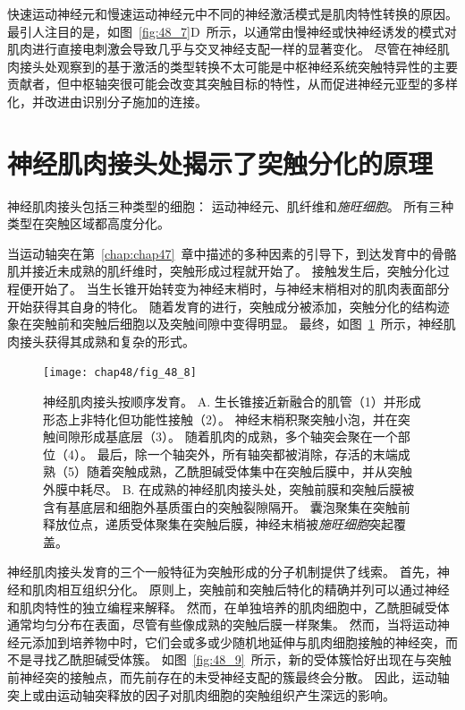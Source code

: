 快速运动神经元和慢速运动神经元中不同的神经激活模式是肌肉特性转换的原因。
最引人注目的是，如图~\ref{fig:48_7}D~所示，以通常由慢神经或快神经诱发的模式对肌肉进行直接电刺激会导致几乎与交叉神经支配一样的显著变化。
尽管在神经肌肉接头处观察到的基于激活的类型转换不太可能是中枢神经系统突触特异性的主要贡献者，但中枢轴突很可能会改变其突触目标的特性，从而促进神经元亚型的多样化，并改进由识别分子施加的连接。



\section{神经肌肉接头处揭示了突触分化的原理}

神经肌肉接头包括三种类型的细胞：
运动神经元、肌纤维和\textit{施旺细胞}。
所有三种类型在突触区域都高度分化。


当运动轴突在第~\ref{chap:chap47}~章中描述的多种因素的引导下，到达发育中的骨骼肌并接近未成熟的肌纤维时，突触形成过程就开始了。
接触发生后，突触分化过程便开始了。
当生长锥开始转变为神经末梢时，与神经末梢相对的肌肉表面部分开始获得其自身的特化。
随着发育的进行，突触成分被添加，突触分化的结构迹象在突触前和突触后细胞以及突触间隙中变得明显。
最终，如图~\ref{fig:48_8}~所示，神经肌肉接头获得其成熟和复杂的形式。


\begin{figure}[htbp]
	\centering
	\texttt{[image: chap48/fig\_48\_8]}
	\caption{神经肌肉接头按顺序发育。
		A. 生长锥接近新融合的肌管（1）并形成形态上非特化但功能性接触（2）。
		神经末梢积聚突触小泡，并在突触间隙形成基底层（3）。
		随着肌肉的成熟，多个轴突会聚在一个部位（4）。
		最后，除一个轴突外，所有轴突都被消除，存活的末端成熟（5）随着突触成熟，乙酰胆碱受体集中在突触后膜中，并从突触外膜中耗尽\cite{hall1993synaptic}。
		B. 在成熟的神经肌肉接头处，突触前膜和突触后膜被含有基底层和细胞外基质蛋白的突触裂隙隔开。
		囊泡聚集在突触前释放位点，递质受体聚集在突触后膜，神经末梢被\textit{施旺细胞}突起覆盖。}
	\label{fig:48_8}
\end{figure}


神经肌肉接头发育的三个一般特征为突触形成的分子机制提供了线索。 
首先，神经和肌肉相互组织分化。
原则上，突触前和突触后特化的精确并列可以通过神经和肌肉特性的独立编程来解释。
然而，在单独培养的肌肉细胞中，乙酰胆碱受体通常均匀分布在表面，尽管有些像成熟的突触后膜一样聚集。
然而，当将运动神经元添加到培养物中时，它们会或多或少随机地延伸与肌肉细胞接触的神经突，而不是寻找乙酰胆碱受体簇。
如图~\ref{fig:48_9}~所示，新的受体簇恰好出现在与突触前神经突的接触点，而先前存在的未受神经支配的簇最终会分散。
因此，运动轴突上或由运动轴突释放的因子对肌肉细胞的突触组织产生深远的影响。


